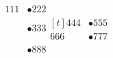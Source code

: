 \documentclass{article}
\begin{document}
\begin{align}
	111 & \bullet 222                    \\
	    & \bullet 333 \begin{aligned}[t]
		                  444 & \bullet 555 \\
		                  666 & \bullet 777
	                  \end{aligned} \\
	    & \bullet 888                    \\
\end{align}
\end{document}
